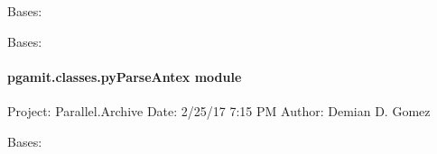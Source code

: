\documentclass[letterpaper,10pt,english]{sphinxmanual}
\begin{document}
\begin{fulllineitems}
\label{\detokenize{pgamit.classes:pgamit.classes.pyPPP.pyRunPPPExceptionTooFewAcceptedObs}}
\pysigstartsignatures
\pysiglinewithargsret
{}
{}
{}
\pysigstopsignatures
\sphinxAtStartPar
Bases: {\hyperref[\detokenize{pgamit.classes:pgamit.classes.pyPPP.pyRunPPPException}]{}}

\end{fulllineitems}


\begin{fulllineitems}
\label{\detokenize{pgamit.classes:pgamit.classes.pyPPP.pyRunPPPExceptionZeroProcEpochs}}
\pysigstartsignatures
\pysiglinewithargsret
{}
{}
{}
\pysigstopsignatures
\sphinxAtStartPar
Bases: {\hyperref[\detokenize{pgamit.classes:pgamit.classes.pyPPP.pyRunPPPException}]{}}

\end{fulllineitems}



\paragraph{pgamit.classes.pyParseAntex module}
\label{\detokenize{pgamit.classes:module-pgamit.classes.pyParseAntex}}\label{\detokenize{pgamit.classes:pgamit-classes-pyparseantex-module}}
\sphinxAtStartPar
Project: Parallel.Archive
Date: 2/25/17 7:15 PM
Author: Demian D. Gomez

\begin{fulllineitems}
\label{\detokenize{pgamit.classes:pgamit.classes.pyParseAntex.ParseAntexFile}}
\pysigstartsignatures
\pysiglinewithargsret
{}
{}
{}
\pysigstopsignatures
\sphinxAtStartPar
Bases: 

\end{fulllineitems}
\end{document}
